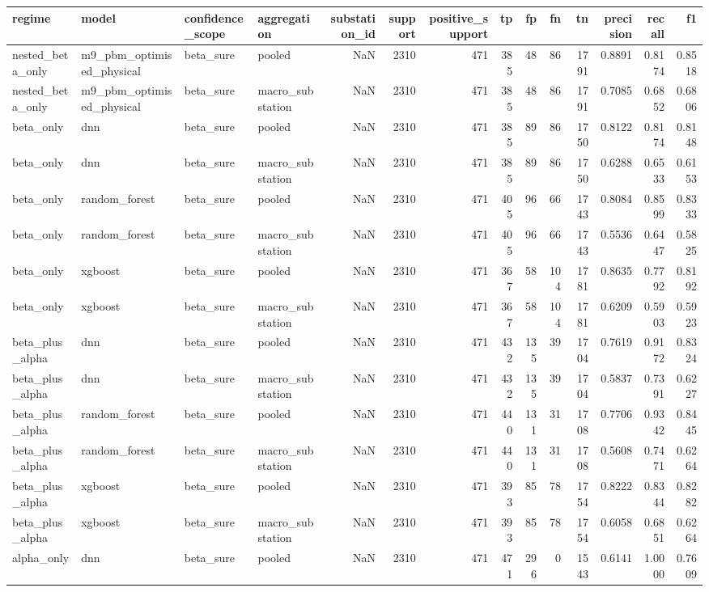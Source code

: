 \begin{tabular}{llllrrrrrrrrrr}
\toprule
regime & model & confidence_scope & aggregation & substation_id & support & positive_support & tp & fp & fn & tn & precision & recall & f1 \\
\midrule
nested_beta_only & m9_pbm_optimised_physical & beta_sure & pooled & NaN & 2310 & 471 & 385 & 48 & 86 & 1791 & 0.8891 & 0.8174 & 0.8518 \\
nested_beta_only & m9_pbm_optimised_physical & beta_sure & macro_substation & NaN & 2310 & 471 & 385 & 48 & 86 & 1791 & 0.7085 & 0.6852 & 0.6806 \\
beta_only & dnn & beta_sure & pooled & NaN & 2310 & 471 & 385 & 89 & 86 & 1750 & 0.8122 & 0.8174 & 0.8148 \\
beta_only & dnn & beta_sure & macro_substation & NaN & 2310 & 471 & 385 & 89 & 86 & 1750 & 0.6288 & 0.6533 & 0.6153 \\
beta_only & random_forest & beta_sure & pooled & NaN & 2310 & 471 & 405 & 96 & 66 & 1743 & 0.8084 & 0.8599 & 0.8333 \\
beta_only & random_forest & beta_sure & macro_substation & NaN & 2310 & 471 & 405 & 96 & 66 & 1743 & 0.5536 & 0.6447 & 0.5825 \\
beta_only & xgboost & beta_sure & pooled & NaN & 2310 & 471 & 367 & 58 & 104 & 1781 & 0.8635 & 0.7792 & 0.8192 \\
beta_only & xgboost & beta_sure & macro_substation & NaN & 2310 & 471 & 367 & 58 & 104 & 1781 & 0.6209 & 0.5903 & 0.5923 \\
beta_plus_alpha & dnn & beta_sure & pooled & NaN & 2310 & 471 & 432 & 135 & 39 & 1704 & 0.7619 & 0.9172 & 0.8324 \\
beta_plus_alpha & dnn & beta_sure & macro_substation & NaN & 2310 & 471 & 432 & 135 & 39 & 1704 & 0.5837 & 0.7391 & 0.6227 \\
beta_plus_alpha & random_forest & beta_sure & pooled & NaN & 2310 & 471 & 440 & 131 & 31 & 1708 & 0.7706 & 0.9342 & 0.8445 \\
beta_plus_alpha & random_forest & beta_sure & macro_substation & NaN & 2310 & 471 & 440 & 131 & 31 & 1708 & 0.5608 & 0.7471 & 0.6264 \\
beta_plus_alpha & xgboost & beta_sure & pooled & NaN & 2310 & 471 & 393 & 85 & 78 & 1754 & 0.8222 & 0.8344 & 0.8282 \\
beta_plus_alpha & xgboost & beta_sure & macro_substation & NaN & 2310 & 471 & 393 & 85 & 78 & 1754 & 0.6058 & 0.6851 & 0.6264 \\
alpha_only & dnn & beta_sure & pooled & NaN & 2310 & 471 & 471 & 296 & 0 & 1543 & 0.6141 & 1.0000 & 0.7609 \\

\end{tabular}
